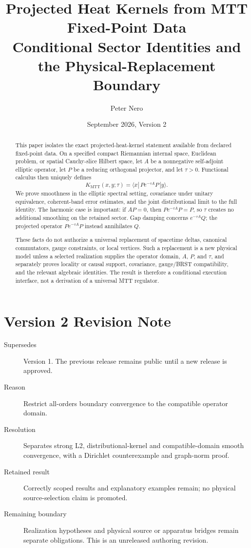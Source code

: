 \documentclass[11pt]{article}
\title{\textbf{Projected Heat Kernels from MTT Fixed-Point Data}\\
\large Conditional Sector Identities and the Physical-Replacement Boundary}
\author{Peter Nero}
\date{September 2026, Version 2}
\begin{document}
\maketitle

\begin{abstract}
This paper isolates the exact projected-heat-kernel statement available from
declared fixed-point data.  On a specified compact Riemannian internal space,
Euclidean problem, or spatial Cauchy-slice Hilbert space, let \(A\) be a
nonnegative self-adjoint elliptic operator, let \(P\) be a reducing
orthogonal projector, and let \(\tau>0\).  Functional calculus then uniquely
defines
\[
        K_{\mathrm{MTT}}(x,y;\tau)
        =
        \langle x|\,P e^{-\tau A}P\,|y\rangle .
\]
We prove smoothness in the elliptic spectral setting, covariance under
unitary equivalence, coherent-band error estimates, and the joint
distributional limit to the full identity.  The harmonic case is important:
if \(AP=0\), then \(Pe^{-\tau A}P=P\), so \(\tau\) creates no additional
smoothing on the retained sector.  Gap damping concerns
\(e^{-\tau A}Q\); the projected operator \(Pe^{-\tau A}P\) instead
annihilates \(Q\).

These facts do not authorize a universal replacement of spacetime deltas,
canonical commutators, gauge constraints, or local vertices.  Such a
replacement is a new physical model unless a selected realization supplies
the operator domain, \(A\), \(P\), and \(\tau\), and separately proves
locality or causal support, covariance, gauge/BRST compatibility, and the
relevant algebraic identities.  The result is therefore a conditional
execution interface, not a derivation of a universal MTT regulator.
\end{abstract}

\section*{Version 2 Revision Note}
\begin{description}
\item[Supersedes] Version 1. The previous release remains public until a new release is approved.
\item[Reason] Restrict all-orders boundary convergence to the compatible operator domain.
\item[Resolution] Separates strong L2, distributional-kernel and compatible-domain smooth convergence, with a Dirichlet counterexample and graph-norm proof.
\item[Retained result] Correctly scoped results and explanatory examples remain; no physical source-selection claim is promoted.
\item[Remaining boundary] Realization hypotheses and physical source or apparatus bridges remain separate obligations. This is an unreleased authoring revision.
\end{description}
\end{document}
